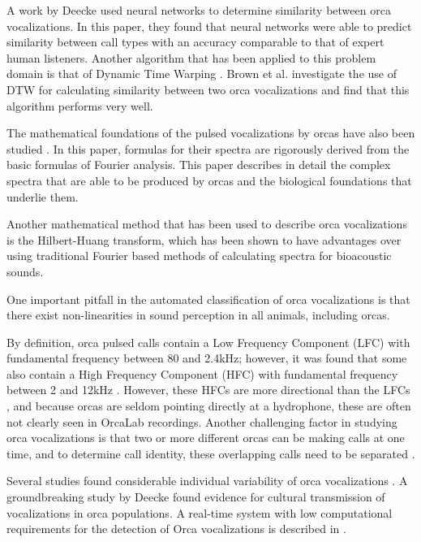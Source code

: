 \documentclass[12pt,oneside]{book}
\begin{document}
A work by Deecke \cite{deecke1999quantifying} used neural networks to
determine similarity between orca vocalizations.  In this paper, they
found that neural networks were able to predict similarity between
call types with an accuracy comparable to that of expert human
listeners.  Another algorithm that has been applied to this problem
domain is that of Dynamic Time Warping \cite{deecke2006pitfalls}.
Brown et al. \cite{brown2006classifying} \cite{brown2007dtw}
investigate the use of DTW for calculating similarity between two orca
vocalizations and find that this algorithm performs very well.

The mathematical foundations of the pulsed vocalizations by orcas have
also been studied \cite{brown2008math}.  In this paper, formulas for
their spectra are rigorously derived from the basic formulas of
Fourier analysis.  This paper describes in detail the complex spectra
that are able to be produced by orcas and the biological foundations
that underlie them.

Another mathematical method that has been used to describe orca
vocalizations is the Hilbert-Huang transform, which has been shown
\cite{adam2006hilbert} to have advantages over using traditional
Fourier based methods of calculating spectra for bioacoustic sounds.

One important pitfall in the automated classification of orca
vocalizations is that there exist non-linearities in sound perception
in all animals, including orcas\cite{nummela1999anatomy}.

By definition, orca pulsed calls contain a Low Frequency Component
(LFC) with fundamental frequency between 80 and 2.4kHz; however, it
was found that some also contain a High Frequency Component (HFC) with
fundamental frequency between 2 and 12kHz \cite{hoelzel1986call}.
However, these HFCs are more directional than the LFCs
\cite{miller2002mixed}, and because orcas are seldom pointing directly
at a hydrophone, these are often not clearly seen in OrcaLab
recordings.  Another challenging factor in studying orca vocalizations
is that two or more different orcas can be making calls at one time,
and to determine call identity, these overlapping calls need to be
separated \cite{ford1987catalogue}.

Several studies found considerable individual variability of orca
vocalizations \cite{miller2000orca} \cite{nousek2006social}
\cite{parijs2004norwegian}.  A groundbreaking study by Deecke
\cite{deecke2000dialect} found evidence for cultural transmission
of vocalizations in orca populations.  A real-time system with low
computational requirements for the detection of Orca vocalizations is
described in \cite{luke2010realtime}.
\end{document}
